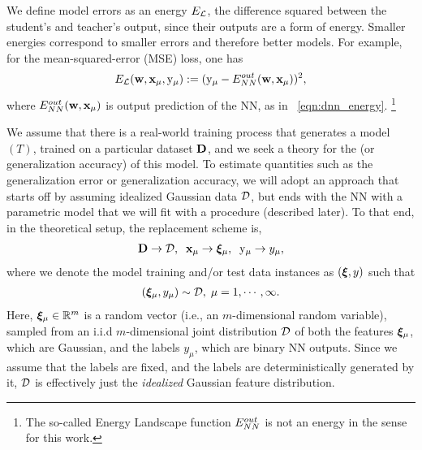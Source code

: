 We define model errors
as an energy ${E}_{\mathcal{L}}$, the difference squared between the student's and teacher's output, since their outputs are a form of energy.
Smaller energies correspond to smaller errors and therefore better models.
For example, for the mean-squared-error (MSE) loss, one has
\begin{align}
  \label{eqn:DEy}
  {E}_{\mathcal{L}}({\mathbf{w}},{\mathbf{x}}_{\mu},\mathrm{y}_{\mu}):= (\mathrm{y}_{\mu}-E^{out}_{NN}({\mathbf{w}},{\mathbf{x}}_{\mu}))^{2}  ,
\end{align}
where $E^{out}_{NN}({\mathbf{w}},{\mathbf{x}}_{\mu})$ is output prediction of the NN, as in \EQN~\ref{eqn:dnn_energy}.
\footnote{The so-called Energy Landscape function $E^{out}_{NN}$ is not an energy  in the sense for this work.}


We assume that there is a real-world training process that generates a \Teacher model $(T)$, trained on a particular dataset $\mathbf{D}$, and we seek a theory for the \Quality (or generalization accuracy) of this model.
 To estimate quantities such as the generalization error or generalization accuracy, we will adopt an approach that starts off by assuming idealized Gaussian data $\mathcal{D}$, 
 but ends with  the NN with a parametric model that we will fit with a \SemiEmpirical procedure (described later).
 To that end, in the theoretical setup,
the replacement scheme is,
\begin{align}
\label{eqn:model_real_world_expt}
  \mathbf{D} \rightarrow \mathcal{D},\;\;{\mathbf{x}}_{\mu} \rightarrow \boldsymbol{\xi}_{\mu},\;\;  \mathrm{y}_{\mu} \rightarrow y_{\mu}  ,
\end{align}
where we denote the model training and/or test data instances as $(\boldsymbol{\xi},y)$ 
such that
\begin{align}
    \label{eqn:xi}
  \left(\boldsymbol{\xi}_{\mu}, y_{\mu} \right) \sim \mathcal{D},\;\mu=1, \cdots, \infty  .
\end{align}
Here, $\boldsymbol{\xi}_{\mu}\in\mathbb{R}^{m}$ is a random vector (i.e., an $m$-dimensional random variable), sampled from an i.i.d $m$-dimensional joint distribution $\mathcal{D}$ of both the features $\boldsymbol{\xi}_{\mu}$, which are Gaussian, and the labels $y_{\mu}$, which are binary NN outputs. Since we assume that the labels are fixed, and the labels are deterministically generated by it, $\mathcal{D}$ is effectively just the \emph{idealized} Gaussian feature distribution.
%

